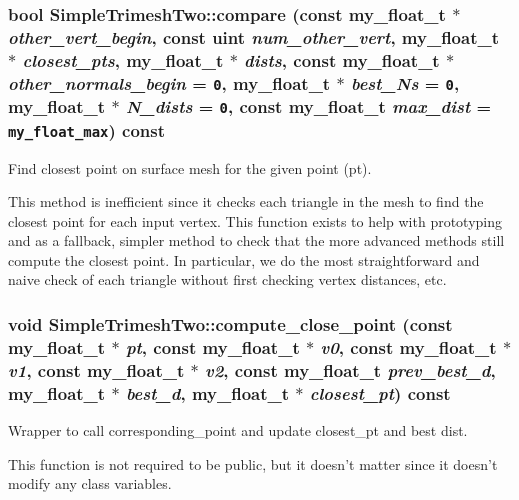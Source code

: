 \subsubsection{\setlength{\rightskip}{0pt plus 5cm}bool Simple\-Trimesh\-Two::compare (const my\_\-float\_\-t $\ast$ {\em other\_\-vert\_\-begin}, const uint {\em num\_\-other\_\-vert}, my\_\-float\_\-t $\ast$ {\em closest\_\-pts}, my\_\-float\_\-t $\ast$ {\em dists}, const my\_\-float\_\-t $\ast$ {\em other\_\-normals\_\-begin} = {\tt 0}, my\_\-float\_\-t $\ast$ {\em best\_\-Ns} = {\tt 0}, my\_\-float\_\-t $\ast$ {\em N\_\-dists} = {\tt 0}, const my\_\-float\_\-t {\em max\_\-dist} = {\tt my\_\-float\_\-max}) const\hspace{0.3cm}{\tt  [virtual]}}\label{classASCbase_1_1geometry_1_1SimpleTrimeshTwo_6a394127681e1e61e8ce2e14e6a6d8ae}


Find closest point on surface mesh for the given point (pt). 

This method is inefficient since it checks each triangle in the mesh to find the closest point for each input vertex. This function exists to help with prototyping and as a fallback, simpler method to check that the more advanced methods still compute the closest point. In particular, we do the most straightforward and naive check of each triangle without first checking vertex distances, etc. 
\subsubsection{\setlength{\rightskip}{0pt plus 5cm}void Simple\-Trimesh\-Two::compute\_\-close\_\-point (const my\_\-float\_\-t $\ast$ {\em pt}, const my\_\-float\_\-t $\ast$ {\em v0}, const my\_\-float\_\-t $\ast$ {\em v1}, const my\_\-float\_\-t $\ast$ {\em v2}, const my\_\-float\_\-t {\em prev\_\-best\_\-d}, my\_\-float\_\-t $\ast$ {\em best\_\-d}, my\_\-float\_\-t $\ast$ {\em closest\_\-pt}) const}\label{classASCbase_1_1geometry_1_1SimpleTrimeshTwo_acb3a26966405908d642026fe52e2395}


Wrapper to call corresponding\_\-point and update closest\_\-pt and best dist. 

This function is not required to be public, but it doesn't matter since it doesn't modify any class variables. 
